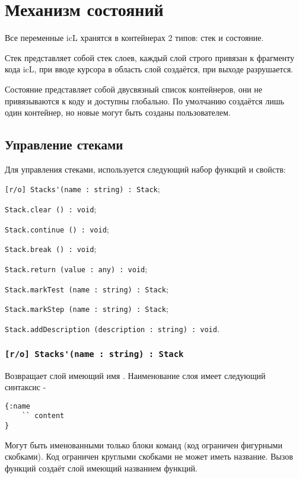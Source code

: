 \section{Механизм состояний}

Все переменные icL хранятся в контейнерах 2 типов: стек и состояние.

Стек представляет собой стек слоев, каждый слой строго привязан к фрагменту кода icL, при вводе курсора в область слой создаётся, при выходе разрушается.

Состояние представляет собой двусвязный список контейнеров, они не привязываются к коду и доступны глобально. По умолчанию создаётся лишь один контейнер, но новые могут быть созданы пользователем.

\subsection{Управление стеками}

Для управления стеками, используется следующий набор функций и свойств:
\begin{icItems}
	\item \lstinline|[r/o] Stacks'(name : string) : Stack|;
	\item \lstinline|Stack.clear () : void|;
	\item \lstinline|Stack.continue () : void|;
	\item \lstinline|Stack.break () : void|;
	\item \lstinline|Stack.return (value : any) : void|;
	\item \lstinline|Stack.markTest (name : string) : Stack|;
	\item \lstinline|Stack.markStep (name : string) : Stack|;
	\item \lstinline|Stack.addDescription (description : string) : void|.
\end{icItems}

\subsubsection{\lstinline|[r/o] Stacks'(name : string) : Stack|}

Возвращает слой имеющий имя . Наименование слоя имеет следующий синтаксис -
\begin{lstlisting}[numbers=none]
{:name
	`` content
}
\end{lstlisting}
Могут быть именованными только блоки команд (код ограничен фигурными скобками). Код ограничен круглыми скобками не может иметь название. Вызов функций создаёт слой имеющий названием функций.

